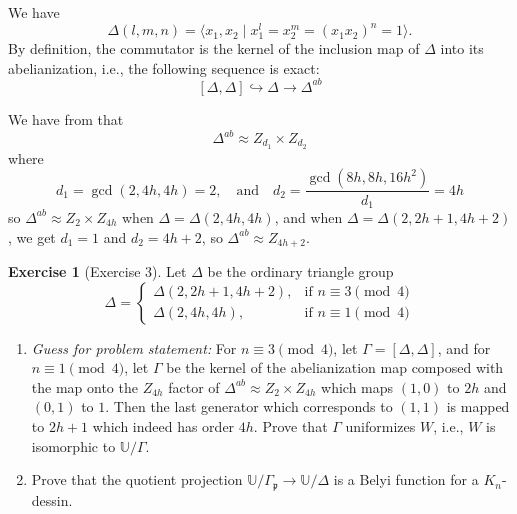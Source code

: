 \documentclass[reqno]{amsart}
\theoremstyle{definition}
\newtheorem{exercise}[theorem]{Exercise}
\theoremstyle{remark}
\begin{document}
We have 
    \[
    \Delta (l,m,n) =
    \langle x_1, x_2 \mid 
    x_1^l = x_2^m = (x_1 x_2)^{n} = 1
    \rangle.
    \]
    By definition, the commutator is
    the kernel of the inclusion map
    of $\Delta$ into its abelianization, i.e.,
    the following sequence is exact:
    \[
    \left[ \Delta, \Delta \right] \hookrightarrow
    \Delta \to \Delta^{ab}
    \]

    We have from \cite[p~105]{Albar-Al-Hamdan} that 
   \[
    \Delta^{ab}
    \approx Z_{d_1} \times Z_{d_2}\]
where
\[d_1 = \gcd(2,4h,4h) = 2, \quad
\text{and} \quad d_2 = \frac{\gcd(8h, 8h, 16h^2)}
{d_1}
= 4h\]
so $\Delta^{ab}
    \approx Z_2 \times Z_{4h}$ when
    $\Delta = \Delta (2,4h, 4h)$, and
    when $\Delta = \Delta (2,2h+1,4h+2)$, we
    get $d_1 = 1$ and $d_2 = 4h+2$, so
    $\Delta^{ab} \approx Z_{4h+2}$.

\begin{exercise}[Exercise 3]
    Let $\Delta$ be the ordinary triangle group
    \[ \Delta = 
    \begin{cases}
        \Delta (2, 2h+1, 4h+2),& \text{if } n \equiv 3 \pmod{4}\\
        \Delta (2,4h,4h),& \text{if } n\equiv 1  \pmod{4}
    \end{cases}
    \]
      \begin{enumerate}
        \item \textit{Guess for problem statement:} 
        For $n \equiv 3 \pmod{4}$,
    let $\Gamma = 
        \left[\Delta, \Delta \right]$, and for $n \equiv
        1 \pmod{4}$, let $\Gamma$ be the kernel of
        the abelianization map composed with the map onto the $Z_{4h}$ factor of $\Delta^{ab} \approx Z_2 \times
        Z_{4h}$ which maps $(1,0)$ to $2h$ and
        $(0,1)$ to $1$. Then the last
        generator which corresponds to $(1,1)$ is mapped to $2h+1$ which indeed has order $4h$. Prove that $\Gamma$ uniformizes 
        $W$, i.e., $W$ is isomorphic to
        $\mathbb{U}/ \Gamma$.
        \item Prove that the quotient
        projection
        $\mathbb{U}/ \Gamma_{\mathfrak{p}} \to
        \mathbb{U}/ \Delta$ is a 
        Belyi function for a
        $K_n$-dessin.
    \end{enumerate}
\end{exercise}
\end{document}
